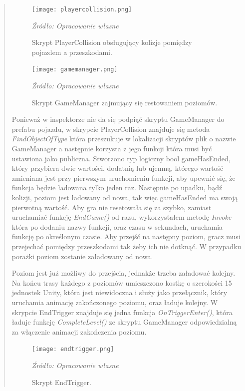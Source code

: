 \begin{quotation}
\begin{figure}[!hbt]
\centering
  \texttt{[image: playercollision.png]}
  \caption{Skrypt PlayerCollision obsługujący kolizje pomiędzy pojazdem a przeszkodami.}\label{rys_7}
  \begin{minipage}[t]{0.75\linewidth}
    \emph{Źródło: Opracowanie własne}
  \end{minipage}
\end{figure}
\begin{figure}[!hbt]
\centering
  \texttt{[image: gamemanager.png]}
  \caption{Skrypt GameManager zajmujący się restowaniem poziomów.}\label{rys_8}
  \begin{minipage}[t]{0.75\linewidth}
    \emph{Źródło: Opracowanie własne}
  \end{minipage}
\end{figure}

\newpage
\indent Ponieważ w inspektorze nie da się podpiąć skryptu GameManager do prefabu pojazdu, w skrypcie PlayerCollision znajduje się metoda \textit{FindObjectOfType} która przeszukuje w lokalizacji skryptów plik o nazwie GameManager a następnie korzysta z jego funkcji która musi być ustawiona jako publiczna. Stworzono typ logiczny bool gameHasEnded, który przybiera dwie wartości, dodatnią lub ujemną, którego wartość zmieniana jest przy pierwszym uruchomieniu funkcji, aby upewnić się, że funkcja będzie ładowana tylko jeden raz. Następnie po upadku, bądź kolizji, poziom jest ładowany od nowa, tak więc gameHasEnded ma swoją pierwotną wartość. Aby gra nie resetowała się za szybko, zamiast uruchamiać funkcję \textit{EndGame()} od razu, wykorzystałem metodę \textit{Invoke} która po dodaniu nazwy funkcji, oraz czasu w sekundach, uruchamia funkcję po określonym czasie. Aby przejść na następny poziom, gracz musi przejechać pomiędzy przeszkodami tak żeby ich nie dotknąć. W przypadku porażki poziom zostanie załadowany od nowa.

\indent Poziom jest już możliwy do przejścia, jednakże trzeba załadować kolejny. Na końcu trasy każdego z poziomów umieszczono kostkę o szerokości 15 jednostek Unity, która jest niewidoczna i służy jako przełącznik, który uruchamia animację zakończonego poziomu, oraz ładuje kolejny. W skrypcie EndTrigger znajduje się jedna funkcja \textit{OnTriggerEnter()}, która ładuje funkcję \textit{CompleteLevel()} ze skryptu GameManager odpowiedzialną za włączenie animacji zakończenia poziomu.

\begin{figure}[!ht]
\centering
  \texttt{[image: endtrigger.png]}
  \caption{Skrypt EndTrigger.}\label{rys_9}
  \begin{minipage}[t]{0.75\linewidth}
    \emph{Źródło: Opracowanie własne}
  \end{minipage}
\end{figure}


\end{quotation}
